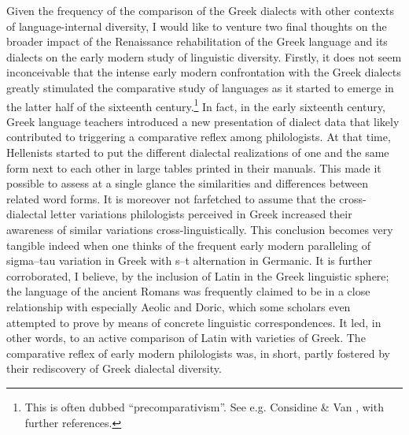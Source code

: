 Given the frequency of the comparison of the Greek dialects with other contexts of language-internal diversity, I would like to venture two final thoughts on the broader impact of the Renaissance rehabilitation of the Greek language and its dialects on the early modern study of linguistic diversity. Firstly, it does not seem inconceivable that the intense early modern confrontation with the Greek dialects greatly stimulated the comparative study of languages as it started to emerge in the latter half of the sixteenth century.\footnote{This is often dubbed “precomparativism”. See e.g. Considine \& Van \citet{Hal2010}, with further references.} In fact, in the early sixteenth century, Greek language teachers introduced a new presentation of dialect data that likely contributed to triggering a comparative reflex among philologists. At that time, Hellenists started to put the different dialectal realizations of one and the same form next to each other in large tables printed in their manuals. This made it possible to assess at a single glance the similarities and differences between related word forms. It is moreover not farfetched to assume that the cross-dialectal letter variations philologists perceived in Greek increased their awareness of similar variations cross-linguistically. This conclusion becomes very tangible indeed when one thinks of the frequent early modern paralleling of sigma–tau variation in Greek with s–t alternation in Germanic. It is further corroborated, I believe, by the inclusion of Latin in the Greek linguistic sphere; the language of the ancient Romans was frequently claimed to be in a close relationship with especially Aeolic and Doric, which some scholars even attempted to prove by means of concrete linguistic correspondences. It led, in other words, to an active comparison of Latin with varieties of Greek. The comparative reflex of early modern philologists was, in short, partly fostered by their rediscovery of Greek dialectal diversity.

